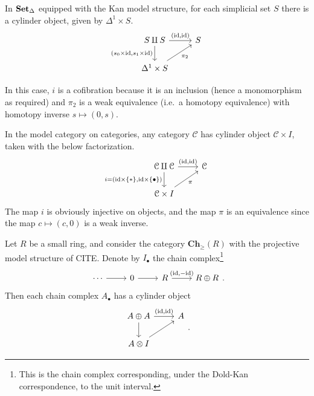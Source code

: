\documentclass[main.tex]{subfiles}
\begin{document}
\begin{example}
  \label{eg:cylinder_objects_in_sset}
  In $\operatorname{\mathbf{Set}_{\Delta}}$ equipped with the Kan model structure, for each simplicial set $S$ there is a cylinder object, given by $\Delta^{1} \times S$.
  \begin{equation*}
    \begin{tikzcd}
      S \amalg S
      \arrow[r, "{(\id, \id)}"]
      \arrow[d, swap, "{(s_{0} \times \id, s_{1} \times \id)}"]
      & S
      \\
      \Delta^{1} \times S
      \arrow[ur, swap, "\pi_{2}"]
    \end{tikzcd}
  \end{equation*}

  In this case, $i$ is a cofibration because it is an inclusion (hence a monomorphism as required) and $\pi_{2}$ is a weak equivalence (i.e.\ a homotopy equivalence) with homotopy inverse $s \mapsto (0, s)$.
\end{example}

\begin{example}
  \label{eg:cylinder_objects_in_model_structure_on_cat}
  In the model category on categories, any category $\mathcal{C}$ has cylinder object $\mathcal{C} \times I$, taken with the below factorization.
  \begin{equation*}
    \begin{tikzcd}
      \mathcal{C} \amalg \mathcal{C}
      \arrow[d, swap, "i = {(\id \times \{*\}, \id \times \{\bullet\})}"]
      \arrow[r, "{(\id, \id)}"]
      & \mathcal{C}
      \\
      \mathcal{C} \times I
      \arrow[ur, swap, "\pi"]
    \end{tikzcd}
  \end{equation*}
  The map $i$ is obviously injective on objects, and the map $\pi$ is an equivalence since the map $c \mapsto (c, 0)$ is a weak inverse.
\end{example}

\begin{example}
  Let $R$ be a small ring, and consider the category $\mathbf{Ch}_{\geq}(R)$ with the projective model structure of CITE. Denote by $I_{\bullet}$ the chain complex\footnote{This is the chain complex corresponding, under the Dold-Kan correspondence, to the unit interval.}
  \begin{equation*}
    \begin{tikzcd}
      \cdots
      \arrow[r]
      & 0
      \arrow[r]
      & R
      \arrow[r, "{( \id, -\id )}"]
      & R \oplus R
    \end{tikzcd}.
  \end{equation*}
  Then each chain complex $A_{\bullet}$ has a cylinder object
  \begin{equation*}
    \begin{tikzcd}
      A \oplus A
      \arrow[d]
      \arrow[r, "{(\id, \id)}"]
      & A
      \\
      A \otimes I
      \arrow[ur]
    \end{tikzcd}.
  \end{equation*}
\end{example}
\end{document}
